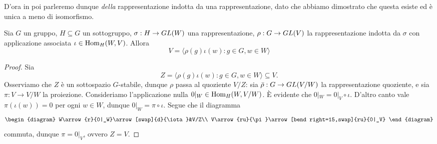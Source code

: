 D'ora in poi parleremo dunque \emph{della} rappresentazione indotta da una rappresentazione, dato che abbiamo dimostrato che questa esiste ed è unica a meno di isomorfismo.

\begin{proposition}
Sia $G$ un gruppo, $H\subseteq G$ un sottogruppo, $\sigma:H\to GL(W)$ una rappresentazione, $\rho:G\to GL(V)$ la rappresentazione indotta da $\sigma$ con applicazione associata $\iota\in\operatorname{Hom}_H(W,V)$. Allora
$$
V=\langle\rho(g)\iota(w):g\in G,w\in W\rangle
$$
\end{proposition}
\begin{proof}
Sia 
$$
Z=\langle\rho(g)\iota(w):g\in G,w\in W\rangle\subseteq V.
$$
Osserviamo che $Z$ è un sottospazio $G$-stabile, dunque $\rho$ passa al quoziente $V/Z$: sia $\bar\rho:G\to GL(V/W)$ la rappresentazione quoziente, e sia $\pi:V\to V/W$ la proiezione. Consideriamo l'applicazione nulla $0|_W\in\operatorname{Hom}_H(W,V/W)$. È evidente che $0|_W=0|_V\circ\iota$. D'altro canto vale $\pi(\iota(w))=0$ per ogni $w\in W$, dunque $0|_W=\pi\circ\iota$. Segue che il diagramma
$$
\begin{diagram}
W\arrow{r}{0|_W}\arrow[swap]{d}{\iota}&V/Z\\
V\arrow{ru}{\pi}\arrow[bend right=15,swap]{ru}{0|_V}
\end{diagram}
$$
commuta, dunque $\pi=0|_V$, ovvero $Z=V$.
\end{proof}

